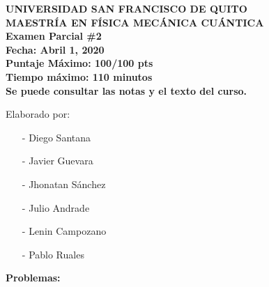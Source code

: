 \documentclass[answers,11pt]{exam}
\renewcommand{\=}[1]{\stackrel{#1}{=}} %
\theoremstyle{definition}
\theoremstyle{remark}
\begin{document}
\begin{center}
{\bf UNIVERSIDAD SAN FRANCISCO DE QUITO\\
MAESTRÍA EN FÍSICA
MECÁNICA CUÁNTICA \\ 
Examen Parcial \#2 \\ 
Fecha: Abril 1, 2020 \\
Puntaje Máximo: 100/100 pts\\
Tiempo máximo: 110 minutos \\ 
Se puede consultar las notas y el texto del curso.\\
}
\end{center}
\vspace{0.1in}


Elaborado por:

\begin{itemize}
 \item[-] Diego Santana
 \item[-] Javier Guevara
 \item[-] Jhonatan Sánchez
 \item[-] Julio Andrade
 \item[-] Lenin Campozano
 \item[-] Pablo Ruales
\end{itemize}
\vspace{0.1in}

{\bf Problemas:}\\

\begin{questions}












\end{questions}
\end{document}
